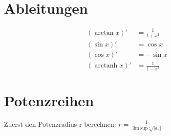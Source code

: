 \documentclass[a4paper,10pt]{article}
\DeclareMathOperator{\arctanh}{arctanh}
\begin{document}
\section{Ableitungen}
\begin{align*}
	(\arctan x)' &= \frac {1}{1 + x^2} \\
	(\sin x)'    &= \cos x \\
	(\cos x)'    &= -\sin x \\
	(\arctanh x)' &= \frac {1}{1 - x^2}
\end{align*}


\section{Potenzreihen}
Zuerst den Potenzradius r berechnen:
\(
	r = \frac {1}{\lim \text{sup} \sqrt[n]{|a_n|}}
\)
\end{document}
